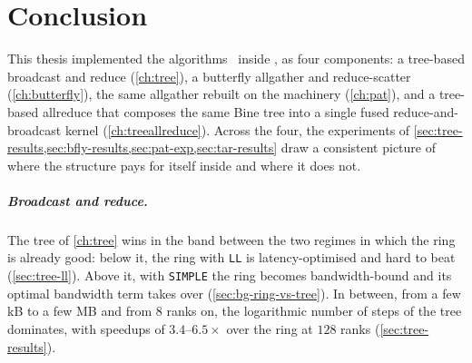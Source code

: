 \chapter{Conclusion}\label{ch:conclusion}

This thesis implemented the \bine{} algorithms~\cite{desensi2025bine} inside \nccl{}, as four components: a tree-based broadcast and reduce (\cref{ch:tree}), a butterfly allgather and reduce-scatter (\cref{ch:butterfly}), the same allgather rebuilt on the \pat{} machinery (\cref{ch:pat}), and a tree-based allreduce that composes the same Bine tree into a single fused reduce-and-broadcast kernel (\cref{ch:treeallreduce}).
Across the four, the experiments of \cref{sec:tree-results,sec:bfly-results,sec:pat-exp,sec:tar-results} draw a consistent picture of where the \bine{} structure pays for itself inside \nccl{} and where it does not.

\paragraph{Broadcast and reduce.}
The tree of \cref{ch:tree} wins in the band between the two regimes in which the ring is already good: below it, the ring with \texttt{LL} is latency-optimised and hard to beat (\cref{sec:tree-ll}). Above it, with \texttt{SIMPLE} the ring becomes bandwidth-bound and its optimal bandwidth term takes over (\cref{sec:bg-ring-vs-tree}).
In between, from a few kB to a few MB and from $8$ ranks on, the logarithmic number of steps of the tree dominates, with speedups of $3.4$--$6.5\times$ over the ring at $128$ ranks (\cref{sec:tree-results}).

